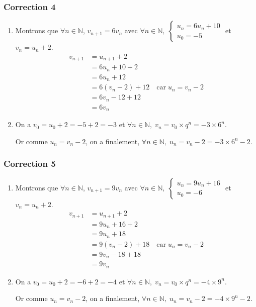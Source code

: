 \documentclass[15pt, mathserif]{beamer}
\begin{document}
\begin{frame}
\vspace{-10mm}
	\frametitle{Correction 4}
\vspace{0.5cm}\begin{enumerate}
	\item  Montrons que $\forall n \in \mathbb{N}$, $v_{n+1} = 6v_n$ avec $\forall n \in \mathbb{N}, \; \begin{cases}u_n = 6u_n+10\\ u_0 = -5\end{cases}$ et $v_n = u_n +2$.
	\begin{align*}
		v_{n+1} &= u_{n+1}+2\\
		&=6u_n+10+2\\
		&=6u_n+12\\
		&=6(v_n-2)+12 \quad \text{car} \; u_n = v_n-2\\
		&=6v_n-12+12\\
		&=6v_n
	\end{align*}
		\item On a $v_0 = u_0+2=-5+2=-3$ et $\forall n \in \mathbb{N}, \; v_n = v_0 \times q^n  = -3\times6^n$.

		Or comme $u_n = v_n-2$, on a finalement, $\forall n \in \mathbb{N}, \; u_n = v_n-2= -3\times6^n-2$.
\end{enumerate}\end{frame}


\begin{frame}
\vspace{-10mm}
	\frametitle{Correction 5}
\vspace{0.5cm}\begin{enumerate}
	\item  Montrons que $\forall n \in \mathbb{N}$, $v_{n+1} = 9v_n$ avec $\forall n \in \mathbb{N}, \; \begin{cases}u_n = 9u_n+16\\ u_0 = -6\end{cases}$ et $v_n = u_n +2$.
	\begin{align*}
		v_{n+1} &= u_{n+1}+2\\
		&=9u_n+16+2\\
		&=9u_n+18\\
		&=9(v_n-2)+18 \quad \text{car} \; u_n = v_n-2\\
		&=9v_n-18+18\\
		&=9v_n
	\end{align*}
		\item On a $v_0 = u_0+2=-6+2=-4$ et $\forall n \in \mathbb{N}, \; v_n = v_0 \times q^n  = -4\times9^n$.

		Or comme $u_n = v_n-2$, on a finalement, $\forall n \in \mathbb{N}, \; u_n = v_n-2= -4\times9^n-2$.
\end{enumerate}\end{frame}
\end{document}
